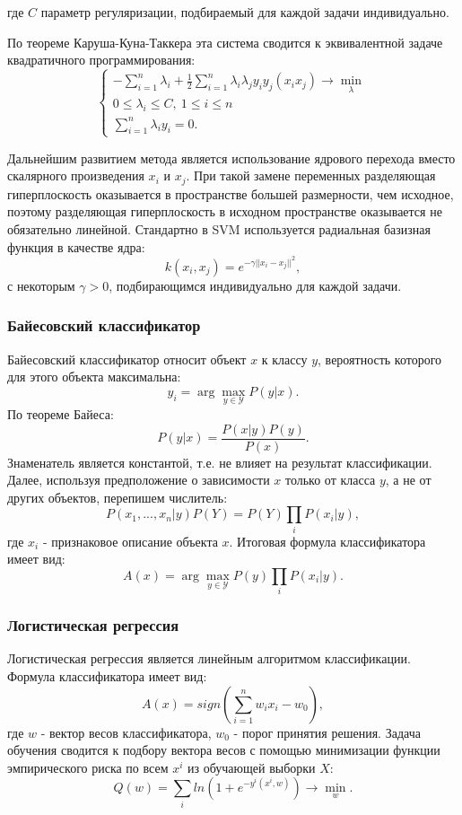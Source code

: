 \documentclass[14pt]{extarticle}
\begin{document}
где $C$ параметр регуляризации, подбираемый для каждой задачи индивидуально.
\par
По теореме Каруша-Куна-Таккера эта система сводится к эквивалентной задаче
квадратичного программирования:
\[\begin{cases}
    -\sum_{i=1}^n \lambda_i + \frac{1}{2}\sum_{i=1}^n \lambda_i\lambda_j
    y_i y_j (x_i x_j) \to \min_\lambda \\
    0 \le \lambda_i \le C,\ 1 \le i \le n \\
    \sum_{i=1}^n \lambda_i y_i=0.
\end{cases}\]
\par
Дальнейшим развитием метода является использование ядрового перехода вместо
скалярного произведения $x_i$ и $x_j$. При такой замене переменных разделяющая 
гиперплоскость оказывается в пространстве большей размерности, чем исходное, поэтому
разделяющая гиперплоскость в исходном пространстве оказывается не обязательно линейной.
Стандартно в SVM используется радиальная базизная функция
в качестве ядра: 
\[
    k(x_i, x_j)=e^{-\gamma||x_i-x_j||^2},
\]
с некоторым $\gamma>0$, 
подбирающимся индивидуально для каждой задачи.

\subsubsection{Байесовский классификатор}

\par
Байесовский классификатор относит объект $x$ к классу $y$, 
вероятность которого для этого объекта максимальна:
\[
    y_i = \arg \max_{y\in\mathcal{Y}} P(y|x).
\]
По теореме Байеса:
\[
    P(y|x)=\frac{P(x|y)P(y)}{P(x)}.
\]
Знаменатель является константой, т.е. не влияет на результат классификации.
Далее, используя предположение о зависимости $x$ только от класса $y$, а не
от других объектов, перепишем числитель:
\[
    P(x_1, ..., x_n|y)P(Y) = P(Y)\prod_i P(x_i|y),
\]
где $x_i$ - признаковое описание объекта $x$. Итоговая формула классификатора имеет вид:
\[
    A(x)=\arg\max_{y\in\mathcal{Y}} P(y)\prod_i P(x_i|y).
\]

\subsubsection{Логистическая регрессия}

\par
Логистическая регрессия является линейным алгоритмом классификации. Формула классификатора
имеет вид:
\[
    A(x) = sign(\sum_{i=1}^n w_i x_i - w_0),
\]
где $w$ - вектор весов классификатора, $w_0$ - порог принятия решения. Задача обучения
сводится к подбору вектора весов с помощью минимизации функции эмпирического риска
по всем $x^i$ из обучающей выборки $X$:
\[
    Q(w)=\sum_i ln(1+e^{-y^i(x^i, w)}) \to \min_w.
\]
\end{document}
